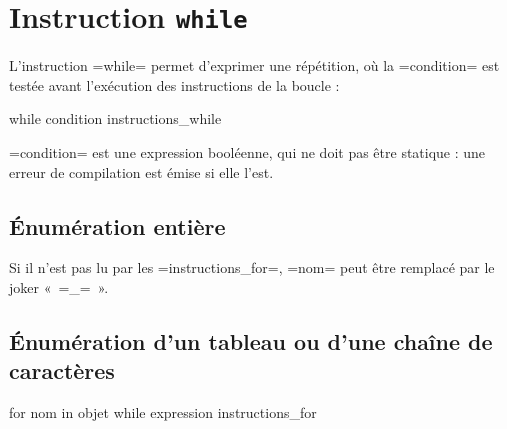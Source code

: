 \section{Instruction \texttt{while}}

L'instruction \plm=while= permet d'exprimer une répétition, où la \plm=condition= est testée avant l'exécution des instructions de la boucle :
\begin{PLM}
while condition {
  instructions_while
}
\end{PLM}

\plm=condition= est une expression booléenne, qui ne doit pas être statique : une erreur de compilation est émise si elle l'est.














\subsection{Énumération entière}

Si il n'est pas lu par les \plm=instructions_for=, \plm=nom= peut être remplacé par le joker « \plm=_= ».




\subsection{Énumération d'un tableau ou d'une chaîne de caractères}

\begin{PLM}
for nom in objet while expression {
  instructions_for
}
\end{PLM}


























